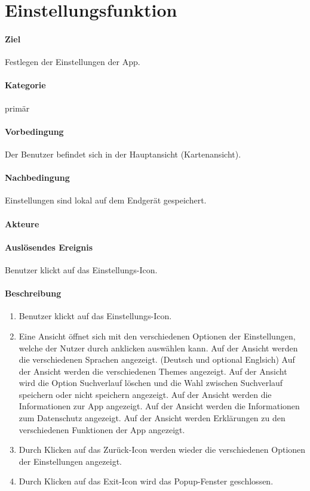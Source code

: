 \section{Einstellungsfunktion}
\paragraph{Ziel}
Festlegen der Einstellungen der App.
\paragraph{Kategorie}
primär
\paragraph{Vorbedingung}
Der Benutzer befindet sich in der Hauptansicht (Kartenansicht).
\paragraph{Nachbedingung}
Einstellungen sind lokal auf dem Endgerät gespeichert.
\paragraph{Akteure}

\paragraph{Auslösendes Ereignis}
Benutzer klickt auf das Einstellungs-Icon.
\paragraph{Beschreibung}
\begin{enumerate}
    \item Benutzer klickt auf das Einstellungs-Icon.
    \item Eine Ansicht öffnet sich mit den verschiedenen Optionen der Einstellungen, welche der Nutzer durch anklicken auswählen kann.
     Auf der Ansicht werden die verschiedenen Sprachen angezeigt. (Deutsch und optional Englsich)
     Auf der Ansicht werden die verschiedenen Themes angezeigt.
     Auf der Ansicht wird die Option Suchverlauf löschen und die Wahl zwischen Suchverlauf speichern oder nicht speichern angezeigt.
     Auf der Ansicht werden die Informationen zur App angezeigt.
     Auf der Ansicht werden die Informationen zum Datenschutz angezeigt.
     Auf der Ansicht werden Erklärungen zu den verschiedenen Funktionen der App angezeigt.
    \item Durch Klicken auf das Zurück-Icon werden wieder die verschiedenen Optionen der Einstellungen angezeigt.
    \item Durch Klicken auf das Exit-Icon wird das Popup-Fenster geschlossen.
\end{enumerate}